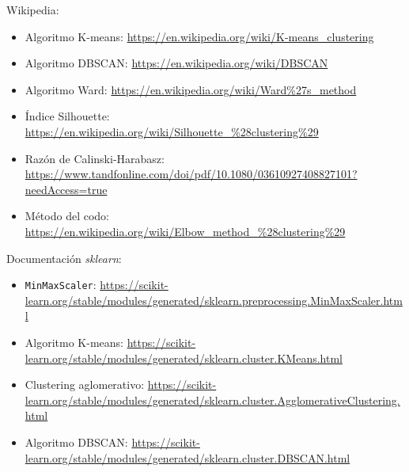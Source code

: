 \documentclass[oneside]{book}
\begin{document}
Wikipedia:
\begin{itemize}
\item Algoritmo K-means: \href{https://en.wikipedia.org/wiki/K-means_clustering}{https://en.wikipedia.org/wiki/K-means\_clustering}
\item Algoritmo DBSCAN: \href{https://en.wikipedia.org/wiki/DBSCAN}{https://en.wikipedia.org/wiki/DBSCAN}
\item Algoritmo Ward: \href{https://en.wikipedia.org/wiki/Ward%27s_method}
    {https://en.wikipedia.org/wiki/Ward\%27s\_method}
  \item Índice Silhouette: \href{https://en.wikipedia.org/wiki/Silhouette_%28clustering%29}
      {https://en.wikipedia.org/wiki/Silhouette\_\%28clustering\%29}
    \item Razón de Calinski-Harabasz: \href{https://www.tandfonline.com/doi/pdf/10.1080/03610927408827101?needAccess=true}{https://www.tandfonline.com/doi/pdf/10.1080/03610927408827101?needAccess=true}
    \item Método del codo: \href{https://en.wikipedia.org/wiki/Elbow_method_%28clustering%29}
        {https://en.wikipedia.org/wiki/Elbow\_method\_\%28clustering\%29}
        
\end{itemize}

Documentación \textit{sklearn}:
\begin{itemize}
\item \texttt{MinMaxScaler}: \href{https://scikit-learn.org/stable/modules/generated/sklearn.preprocessing.MinMaxScaler.html}{https://scikit-learn.org/stable/modules/generated/sklearn.preprocessing.MinMaxScaler.html}
\item Algoritmo K-means: \href{https://scikit-learn.org/stable/modules/generated/sklearn.cluster.KMeans.html}{https://scikit-learn.org/stable/modules/generated/sklearn.cluster.KMeans.html}
\item Clustering aglomerativo:
  \href{https://scikit-learn.org/stable/modules/generated/sklearn.cluster.AgglomerativeClustering.html}{https://scikit-learn.org/stable/modules/generated/sklearn.cluster.AgglomerativeClustering.html}
\item Algoritmo DBSCAN: \href{https://scikit-learn.org/stable/modules/generated/sklearn.cluster.DBSCAN.html}{https://scikit-learn.org/stable/modules/generated/sklearn.cluster.DBSCAN.html}
\end{itemize}
\end{document}
